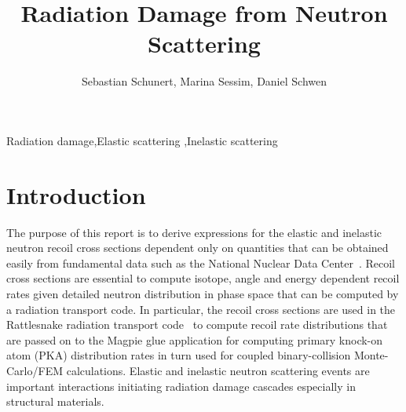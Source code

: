 \documentclass[review]{elsarticle}
\begin{document}
\begin{frontmatter}

\title{Radiation Damage from Neutron Scattering }

\author{Sebastian Schunert, Marina Sessim, Daniel Schwen}
\address{Fuels Modeling and Simulation Department, Idaho National Laboratory, P.O Box 1625, Idaho Falls, ID 83415}




\begin{abstract}

\end{abstract}

\begin{keyword}
Radiation damage\sep Elastic scattering \sep Inelastic scattering
\end{keyword}

\end{frontmatter}

\linenumbers

\section{Introduction}

The purpose of this report is to derive expressions for the elastic and inelastic neutron recoil cross sections dependent only on quantities that can be obtained easily from fundamental data such as the National Nuclear Data Center~\cite{NNDC}. Recoil cross sections are essential to compute isotope, angle and energy dependent recoil rates given detailed neutron distribution in phase space that can be computed by a radiation transport code. In particular, the recoil cross sections are used in the Rattlesnake radiation transport code~\cite{RattlesnakeTheoryManual} to compute recoil rate distributions that are passed on to the Magpie glue application for computing primary knock-on atom (PKA) distribution rates in turn used for coupled binary-collision Monte-Carlo/FEM calculations. Elastic and inelastic neutron scattering events are important interactions initiating radiation damage cascades especially in structural materials.
\end{document}
